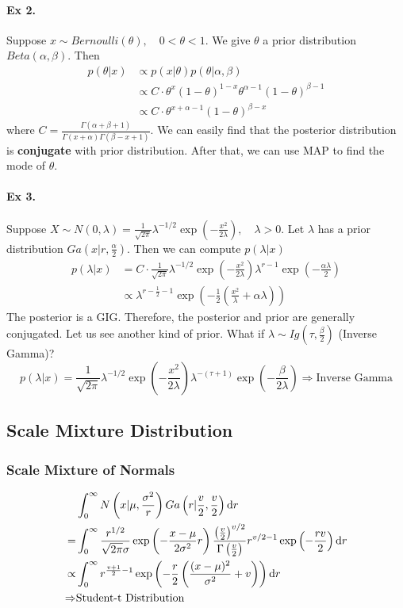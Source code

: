 	\paragraph{Ex 2.}
	Suppose $x\sim Bernoulli(\theta), \quad 0<\theta<1$. We give $\theta$ a prior distribution $Beta(\alpha, \beta)$. Then
	\begin{align*}
		p(\theta|x) &\propto p(x|\theta)p(\theta|\alpha, \beta)\\
		& \propto C\cdot \theta^x(1-\theta)^{1-x}\theta^{\alpha-1}(1-\theta)^{\beta-1}\\
		& \propto C\cdot \theta^{x+\alpha-1}(1-\theta)^{\beta -x}
	\end{align*}
	where $C=\frac{\Gamma(\alpha+\beta+1)}{\Gamma(x+\alpha)\Gamma(\beta-x+1)}$. 	
	We can easily find that the posterior distribution is \textbf{conjugate} with prior distribution. After that, we can use MAP to find the mode of $\theta$.
	
	\paragraph{Ex 3.}
	Suppose $X\sim N(0, \lambda) = \frac{1}{\sqrt{2\pi}}\lambda^{-1/2}\exp\left(-\frac{x^2}{2\lambda}\right), \quad \lambda>0$. Let $\lambda$ has a prior distribution $Ga\left(x|r,\frac{\alpha}{2}\right)$. Then we can compute $p(\lambda|x)$
	\begin{align*}
		p(\lambda|x) &= C\cdot \frac{1}{\sqrt{2\pi}}\lambda^{-1/2}\exp\left(-\frac{x^2}{2\lambda}\right)\lambda^{r-1}\exp(-\frac{\alpha \lambda}{2})\\
		&\propto  \lambda^{r-\frac{1}{2}-1}\exp\left(-\frac{1}{2}\left(\frac{x^2}{\lambda}+\alpha\lambda\right)\right)
	\end{align*}
	The posterior is a GIG. Therefore, the posterior and prior are generally conjugated.
	Let us see another kind of prior. What if $\lambda\sim Ig(\tau, \frac{\beta}{2})$ (Inverse Gamma)?
	$$p(\lambda|x) = \frac{1}{\sqrt{2\pi}}\lambda^{-1/2}\exp\left(-\frac{x^2}{2\lambda}\right) \lambda^{-(\tau+1)}\exp\left(-\frac{\beta}{2\lambda}\right)\Rightarrow \text{Inverse Gamma}$$
	
	\subsection{Scale Mixture Distribution}
		\subsubsection{Scale Mixture of Normals}
		\begin{align*}
			& \int_{0}^{\infty}N\left(x|\mu,\frac{\sigma^2}{r}\right)Ga\left(r|\frac{v}{2},\frac{v}{2}\right)\mathrm{d} r\\
			= & \int_{0}^{\infty} \frac{r^{1/2}}{\sqrt{2\pi}\sigma}\exp\left(-\frac{x-\mu}{2\sigma^2}r\right)\frac{\left(\frac{v}{2}\right)^{v/2}}{\Gamma\left(\frac{v}{2}\right)}r^{v/2-1}\exp\left(-\frac{rv}{2}\right)\mathrm{d} r\\
			\propto & \int_{0}^{\infty} r^{\frac{v+1}{2}-1} \exp\left(-\frac{r}{2}\left(\frac{(x-\mu)^2}{\sigma^2}+v\right)\right)\mathrm{d} r\\
			\Rightarrow & \text{Student-t Distribution}
		\end{align*}
		
